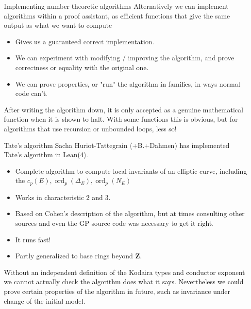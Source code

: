 \documentclass{beamer}
\theoremstyle{plain}
\newcommand{\ZZ}{\mathbf{Z}}
\DeclareMathOperator{\ord}{ord}
\begin{document}
\begin{frame}{Implementing number theoretic algorithms}
    Alternatively we can implement algorithms within a proof assistant, as efficient functions that give the same output as what we want to compute
    \begin{itemize}
        \item Gives us a guaranteed correct implementation.
        \item We can experiment with modifying / improving the algorithm, and prove correctness or equality with the original one.
        \item We can prove properties, or "run" the algorithm in families, in ways normal code can't.
    \end{itemize}

    After writing the algorithm down, it is only accepted as a genuine mathematical function when it is shown to halt.
    With some functions this is obvious, but for algorithms that use recursion or unbounded loops, less so!
\end{frame}

\begin{frame}{Tate's algorithm}
    Sacha Huriot-Tattegrain (+B.+Dahmen) has implemented Tate's algorithm in Lean(4).

    \begin{itemize}
        \item Complete algorithm to compute local invariants of an elliptic curve, including the $c_p(E), \ord_p(\Delta_E), \ord_p(N_E)$

        \item Works in characteristic 2 and 3.

        \item Based on Cohen's description of the algorithm, but at times consulting other sources and even the GP source code was necessary to get it right.

        \item It runs fast!

        \item Partly generalized to base rings beyond $\ZZ$.
    \end{itemize}

    Without an independent definition of the Kodaira types and conductor exponent we cannot actually check the algorithm does what it says.
    Nevertheless we could prove certain properties of the algorithm in future, such as invariance under change of the initial model.
\end{frame}
\end{document}
